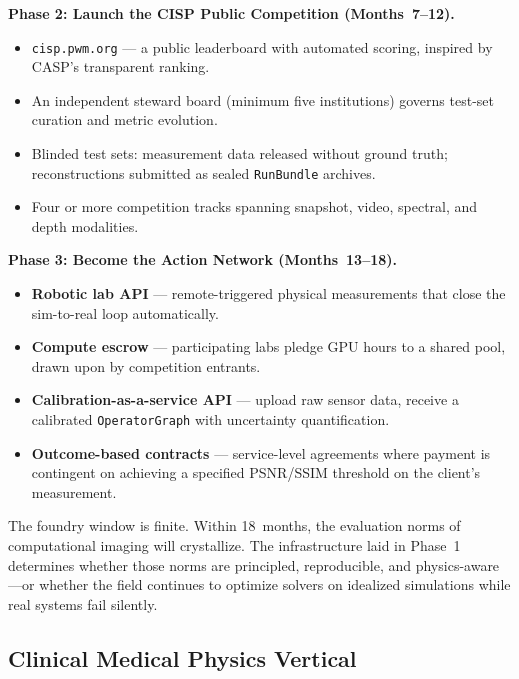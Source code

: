 \medskip
\noindent
\textbf{Phase 2: Launch the CISP Public Competition (Months~7--12).}

\begin{itemize}
  \item \texttt{cisp.pwm.org} --- a public leaderboard with automated
        scoring, inspired by CASP's transparent ranking.
  \item An independent steward board (minimum five institutions) governs
        test-set curation and metric evolution.
  \item Blinded test sets: measurement data released without ground truth;
        reconstructions submitted as sealed \texttt{RunBundle} archives.
  \item Four or more competition tracks spanning snapshot, video,
        spectral, and depth modalities.
\end{itemize}

\medskip
\noindent
\textbf{Phase 3: Become the Action Network (Months~13--18).}

\begin{itemize}
  \item \textbf{Robotic lab API} --- remote-triggered physical
        measurements that close the sim-to-real loop automatically.
  \item \textbf{Compute escrow} --- participating labs pledge GPU hours
        to a shared pool, drawn upon by competition entrants.
  \item \textbf{Calibration-as-a-service API} --- upload raw sensor data,
        receive a calibrated \texttt{OperatorGraph} with uncertainty
        quantification.
  \item \textbf{Outcome-based contracts} --- service-level agreements
        where payment is contingent on achieving a specified PSNR/SSIM
        threshold on the client's measurement.
\end{itemize}

\medskip
\noindent
The foundry window is finite.  Within 18~months, the evaluation norms of
computational imaging will crystallize.  The infrastructure laid in
Phase~1 determines whether those norms are principled, reproducible, and
physics-aware---or whether the field continues to optimize solvers on
idealized simulations while real systems fail silently.

\subsection{Clinical Medical Physics Vertical}

